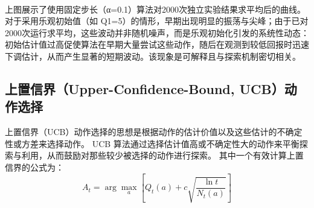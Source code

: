 \documentclass[11pt]{ctexart}
\begin{document}
    \begin{center}
    \end{center}
    { \hspace*{\fill} \\}
    
    上图展示了使用固定步长（α=0.1）算法对2000次独立实验结果求平均后的曲线。对于采用乐观初始值（如
Q1=5）的情形，早期出现明显的振荡与尖峰；由于已对2000次运行求平均，这些波动并非随机噪声，而是乐观初始化引发的系统性动态：初始估计值过高促使算法在早期大量尝试这些动作，随后在观测到较低回报时迅速下调估计，从而产生显著的短期波动。该现象是可解释且与探索机制密切相关。

    \hypertarget{ux4e0aux7f6eux4fe1ux754cupper-confidence-bound-ucbux52a8ux4f5cux9009ux62e9}{%
\subsection{上置信界（Upper-Confidence-Bound,
UCB）动作选择}\label{ux4e0aux7f6eux4fe1ux754cupper-confidence-bound-ucbux52a8ux4f5cux9009ux62e9}}

上置信界（UCB）动作选择的思想是根据动作的估计价值以及这些估计的不确定性或方差来选择动作。
UCB
算法通过选择估计值高或不确定性大的动作来平衡探索与利用，从而鼓励对那些较少被选择的动作进行探索。
其中一个有效计算上置信界的公式为：
\[A_t = \arg\max_a\left[Q_t(a)+c\sqrt{\frac{\ln t}{N_t(a)}}\right]\]
\end{document}
